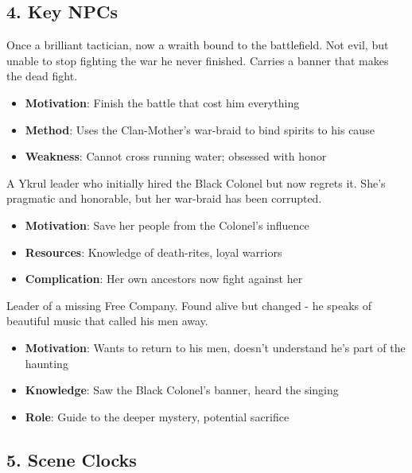 \documentclass[11pt]{article}
\begin{document}
\subsection*{4. Key NPCs}

\begin{description}[leftmargin=*]
\item[The Black Colonel (Antagonist/Enigma)] Once a brilliant tactician, now a wraith bound to the battlefield. Not evil, but unable to stop fighting the war he never finished. Carries a banner that makes the dead fight. 
\begin{itemize}
\item \textbf{Motivation}: Finish the battle that cost him everything
\item \textbf{Method}: Uses the Clan-Mother's war-braid to bind spirits to his cause
\item \textbf{Weakness}: Cannot cross running water; obsessed with honor
\end{itemize}

\item[Clan-Mother Yara (Allies/Obstacle)] A Ykrul leader who initially hired the Black Colonel but now regrets it. She's pragmatic and honorable, but her war-braid has been corrupted.
\begin{itemize}
\item \textbf{Motivation}: Save her people from the Colonel's influence
\item \textbf{Resources}: Knowledge of death-rites, loyal warriors
\item \textbf{Complication}: Her own ancestors now fight against her
\end{itemize}

\item[Captain Thorne (Red Herring/Ally)] Leader of a missing Free Company. Found alive but changed - he speaks of beautiful music that called his men away.
\begin{itemize}
\item \textbf{Motivation}: Wants to return to his men, doesn't understand he's part of the haunting
\item \textbf{Knowledge}: Saw the Black Colonel's banner, heard the singing
\item \textbf{Role}: Guide to the deeper mystery, potential sacrifice
\end{itemize}
\end{description}

\subsection*{5. Scene Clocks}
\end{document}
